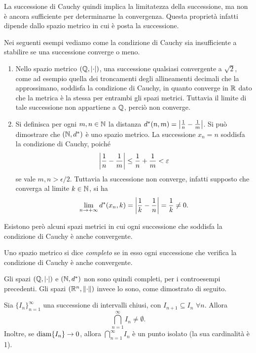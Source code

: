 La successione di Cauchy quindi implica la limitatezza della successione, ma non è ancora sufficiente per determinarne la convergenza. Questa proprietà infatti dipende dallo spazio metrico in cui è posta la successione.
\begin{esempio} \label{es:condizione-cauchy}
	Nei seguenti esempi vediamo come la condizione di Cauchy sia insufficiente a stabilire se una successione converge o meno.
	\begin{enumerate}
		\item Nello spazio metrico $(\Q,\abs{\cdot})$, una successione qualsiasi convergente a $\sqrt{2}$, come ad esempio quella dei troncamenti degli allineamenti decimali che la approssimano, soddisfa la condizione di Cauchy, in quanto converge in $\R$ dato che la metrica è la stessa per entrambi gli spazi metrici. Tuttavia il limite di tale successione non appartiene a $\Q$, perciò non converge.
		\item Si definisca per ogni $m,n\in\N$ la distanza $d^*(n,m)=\abs[\big]{\frac1{n}-\frac1{m}}$. Si può dimostrare che $(\N,d^*)$ è uno spazio metrico. La successione $x_n=n$ soddisfa la condizione di Cauchy, poiché
			\[
				\abs[\bigg]{\frac1{n}-\frac1{m}}\leq\frac1{n}+\frac1{m}<\epsilon
			\]
			se vale $m,n>\epsilon/2$. Tuttavia la successione non converge, infatti supposto che converga al limite $k\in\N$, si ha
			\[
				\lim_{n\to +\infty} d^*(x_n,k)=\abs[\bigg]{\frac1{k}-\frac1{n}}=\frac1{k}\neq 0.
			\]
	\end{enumerate}
\end{esempio}
Esistono però alcuni spazi metrici in cui ogni successione che soddisfa la condizione di Cauchy è anche convergente.
\begin{definizione}
Uno spazio metrico si dice \emph{completo} se in esso ogni successione che verifica la condizione di Cauchy è anche convergente.
\end{definizione}
Gli spazi $(\Q,\abs{\cdot})$ e $(\N,d^*)$ non sono quindi completi, per i controesempi precedenti. Gli spazi $(\R^n,\norm{\cdot})$ invece lo sono, come dimostrato di seguito.
\begin{lemma}
Sia $\{I_n\}_{n=1}^{\infty}$ una successione di intervalli chiusi, con $I_{n+1}\subseteq I_n$ $\forall n$. Allora
\[
\bigcap_{n=1}^{\infty} I_n\neq\emptyset.
\]
Inoltre, se $\diam\{I_n\}\to 0$, allora $\bigcap_{n=1}^{\infty} I_n$ è un punto isolato (la sua cardinalità è 1).
\end{lemma}
